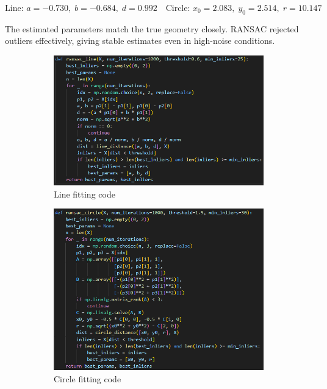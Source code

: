 \documentclass[11pt,a4paper]{article}
\begin{document}
\[
\text{Line: } a=-0.730,\; b=-0.684,\; d=0.992
\quad
\text{Circle: } x_0=2.083,\; y_0=2.514,\; r=10.147
\]

The estimated parameters match the true geometry closely.  
RANSAC rejected outliers effectively, giving stable estimates even in high-noise conditions.

\begin{figure}[H]\centering
\begin{subfigure}{0.31\textwidth}
\includegraphics[width=\linewidth]{images/q2_1_code.png}
\caption{Line fitting code}
\end{subfigure}
\begin{subfigure}{0.31\textwidth}
\includegraphics[width=\linewidth]{images/q2_2_code.png}
\caption{Circle fitting code}
\end{subfigure}
\begin{subfigure}{0.31\textwidth}

\end{subfigure}
\end{figure}
\end{document}
